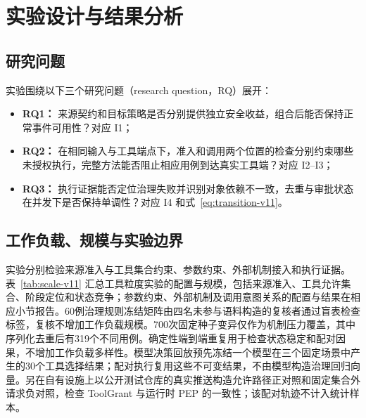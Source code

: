 \section{实验设计与结果分析}\label{sec:evaluation-v11}

\subsection{研究问题}

实验围绕以下三个研究问题（research question，RQ）展开：
\begin{itemize}
  \item \textbf{RQ1：} 来源契约和目标策略是否分别提供独立安全收益，组合后能否保持正常事件可用性？对应 I1；
  \item \textbf{RQ2：} 在相同输入与工具端点下，准入和调用两个位置的检查分别约束哪些未授权执行，完整方法能否阻止相应用例到达真实工具端？对应 I2--I3；
  \item \textbf{RQ3：} 执行证据能否定位治理失败并识别对象依赖不一致，去重与审批状态在并发下是否保持单调性？对应 I4 和式~\eqref{eq:transition-v11}。
\end{itemize}

\subsection{工作负载、规模与实验边界}

实验分别检验来源准入与工具集合约束、参数约束、外部机制接入和执行证据。表~\ref{tab:scale-v11} 汇总工具粒度实验的配置与规模，包括来源准入、工具允许集合、阶段定位和状态竞争；参数约束、外部机制及调用意图关系的配置与结果在相应小节报告。60例治理规则冻结矩阵由四名未参与语料构造的复核者通过盲表检查标签，复核不增加工作负载规模。700次固定种子变异仅作为机制压力覆盖，其中序列化去重后有319个不同用例。确定性端到端重复用于检查状态稳定和配对因果，不增加工作负载多样性。模型决策回放预先冻结一个模型在三个固定场景中产生的30个工具选择结果；配对执行复用这些不可变结果，不由模型构造治理回归向量。另在自有设施上以公开测试仓库的真实推送构造允许路径正对照和固定集合外请求负对照，检查 ToolGrant 与运行时 PEP 的一致性；该配对轨迹不计入统计样本。

